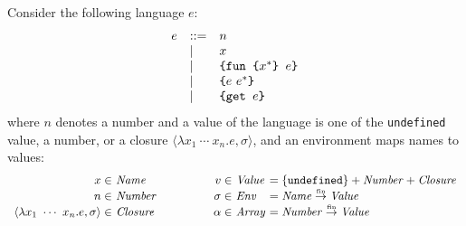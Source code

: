 \newcommand{\cmd}[1]{\texttt{#1}}
\newcommand{\expr}{e}
\newcommand{\vname}{x}
\newcommand{\pname}{f}
\newcommand{\addr}{a}
\newcommand{\val}{v}
\newcommand{\sto}{M}
\newcommand{\seq}[1]{\overline{#1}}
\newcommand{\semrule}[5]{\ensuremath{#1, #2 \vdash #3 \Rightarrow #4, #5}}
\newcommand{\rulesep}{\qquad}
\newcommand{\seqn}{\texttt{seqn}}
\newcommand{\fun}{\texttt{fun}}
\newcommand{\app}{\texttt{app}}
\newcommand{\rec}{\texttt{rec}}
\newcommand{\get}{\texttt{get}}
\newcommand{\set}{\texttt{set}}
\newcommand{\fin}{\texttt{fin}}
\newcommand{\env}{\sigma}
\newcommand{\ccmd}[1]{\texttt{[}#1\texttt{]}}
\newcommand{\cenc}[1]{\texttt{\{}#1\texttt{\}}}
\newcommand{\args}{\ensuremath{\Lambda}}

Consider the following language $\expr$:
\begin{equation*}
\begin{array}{llll}
\expr & ::= 
& n \\
& \mid& \vname \\
& \mid& \verb!{fun {! x^* \verb+} +e\verb+}+\\
& \mid& \verb!{! e\ e^*\verb+}+\\
& \mid & \verb!{get !e\verb!}!
\end{array}
\end{equation*}
where $n$ denotes a number and
a value of the language is one of the \verb!undefined! value, a number,
or a closure $\langle\lambda \vname_1\ \cdots\ \vname_n. \expr,\env\rangle$, and
an environment maps names to values:
\begin{equation*}
\begin{gathered}
\begin{array}{r@{~}lr@{~}l@{~}l}
x \in & \embox{Name} &
\qquad\qquad
  \val \in & \embox{Value} & = \{\verb!undefined!\} + \embox{Number} + \embox{Closure}\\
n \in & \embox{Number} &
  \sigma \in & \embox{Env} & = \embox{Name} \finto \embox{Value}\\
\langle\lambda x_1\ \cdots\ x_n.\expr, \sigma\rangle \in & \embox{Closure} &
  \alpha \in & \embox{Array} & = \embox{Number} \finto \embox{Value} \\
\end{array}
\end{gathered}
\end{equation*}

